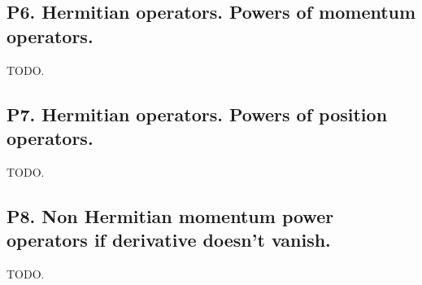 \documentclass{article}
\begin{document}
\subsection{ P6. Hermitian operators. Powers of momentum operators. }

TODO.

\subsection{ P7. Hermitian operators. Powers of position operators. }

TODO.

\subsection{ P8. Non Hermitian momentum power operators if derivative doesn't vanish. }

TODO.



\end{document}
